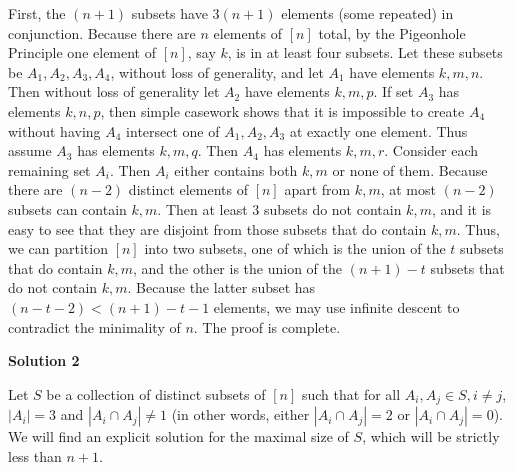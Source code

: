 \begin{enumerate}
 First, the $(n+1)$ subsets have $3(n+1)$ elements (some repeated) in conjunction. Because there are $n$ elements of $[n]$ total, by the Pigeonhole Principle one element of $[n]$, say $k$, is in at least four subsets. Let these subsets be $A_1, A_2, A_3, A_4$, without loss of generality, and let $A_1$ have elements $k, m, n$. Then without loss of generality let $A_2$ have elements $k, m, p$. If set $A_3$ has elements $k, n, p$, then simple casework shows that it is impossible to create $A_4$ without having $A_4$ intersect one of $A_1, A_2, A_3$ at exactly one element. Thus assume $A_3$ has elements $k, m, q$. Then $A_4$ has elements $k, m, r$. Consider each remaining set $A_i$. Then $A_i$ either contains both $k, m$ or none of them. Because there are $(n-2)$ distinct elements of $[n]$ apart from $k, m$, at most $(n-2)$ subsets can contain $k, m$. Then at least 3 subsets do not contain $k, m$, and it is easy to see that they are disjoint from those subsets that do contain $k, m$. Thus, we can partition $[n]$ into two subsets, one of which is the union of the $t$ subsets that do contain $k, m$, and the other is the union of the $(n+1)-t$ subsets that do not contain $k, m$. Because the latter subset has $(n-t-2) < (n+1)-t - 1$ elements, we may use infinite descent to contradict the minimality of $n$. The proof is complete.

 



\textbf{Solution 2}

Let $S$ be a collection of distinct subsets of $[n]$ such that for all $A_i, A_j \in S, i \neq j$, $|A_i| = 3$ and $|A_i \cap A_j| \neq 1$ (in other words, either $|A_i \cap A_j| = 2$ or $|A_i \cap A_j| = 0$). We will find an explicit solution for the maximal size of $S$, which will be strictly less than $n+1$.


\end{enumerate}
